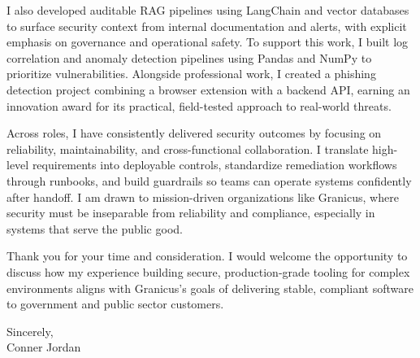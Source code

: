 \documentclass[letterpaper,11pt]{article}
\begin{document}
\vspace{16pt}

I also developed auditable RAG pipelines using LangChain and vector databases to surface security context from internal documentation and alerts, with explicit emphasis on governance and operational safety. To support this work, I built log correlation and anomaly detection pipelines using Pandas and NumPy to prioritize vulnerabilities. Alongside professional work, I created a phishing detection project combining a browser extension with a backend API, earning an innovation award for its practical, field-tested approach to real-world threats.

\vspace{16pt}

Across roles, I have consistently delivered security outcomes by focusing on reliability, maintainability, and cross-functional collaboration. I translate high-level requirements into deployable controls, standardize remediation workflows through runbooks, and build guardrails so teams can operate systems confidently after handoff. I am drawn to mission-driven organizations like Granicus, where security must be inseparable from reliability and compliance, especially in systems that serve the public good.

\vspace{16pt}

Thank you for your time and consideration. I would welcome the opportunity to discuss how my experience building secure, production-grade tooling for complex environments aligns with Granicus’s goals of delivering stable, compliant software to government and public sector customers.

\vspace{16pt}

Sincerely,\\
Conner Jordan
\end{document}
